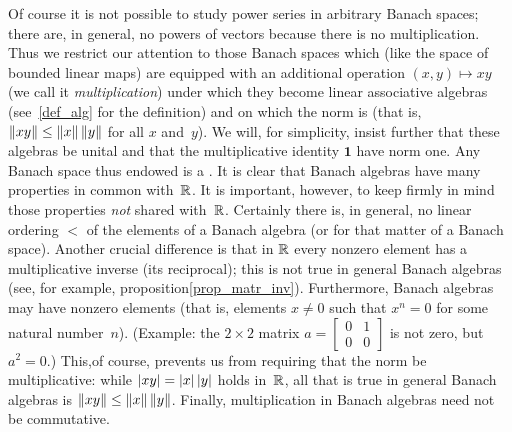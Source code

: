 Of course it is not possible to study power series in arbitrary Banach spaces; there are, in
general, no powers of vectors because there is no multiplication.  Thus we restrict our
attention to those Banach spaces which (like the space of bounded linear maps) are equipped
with an additional operation $(x,y) \mapsto xy$ (we call it \emph{multiplication}) under which
they become linear associative algebras (see~\ref{def_alg} for the definition) and on which
the norm is
 (that is, $\lVert xy\rVert \le \lVert x\rVert\,\lVert y\rVert$ for all $x$ and~$y$).  We
will, for simplicity, insist further that these algebras be unital and that the multiplicative
identity $\boldsymbol 1$ have norm one.  Any Banach space thus endowed is a .  It is clear that Banach algebras have many properties in common with~$\mathbb{R}$.
It is important, however, to keep firmly in mind those properties \emph{not} shared with~$\mathbb{R}$.
Certainly there is, in general, no linear ordering $<$ of the elements of a Banach algebra (or
for that matter of a Banach space).  Another crucial difference is that in $\mathbb{R}$ every nonzero
element has a multiplicative inverse (its reciprocal); this is not true in general Banach
algebras (see, for example, proposition\ref{prop_matr_inv}).  Furthermore, Banach algebras may
have nonzero
 elements (that is, elements $x \ne 0$ such that $x^n = 0$ for some natural
number~$n$).  (Example: the $2 \times 2$ matrix
         $a = \begin{bmatrix} 0  &  1 \\
                               0  &  0
              \end{bmatrix}$ is not zero, but $a^2 = 0$.)  This,of course, prevents us from requiring
that the norm be multiplicative: while $\lvert xy\rvert = \lvert x\rvert\,\lvert y\rvert$ holds in~$\mathbb{R}$, all that is
true in general Banach algebras is $\lVert xy\rVert \le \lVert x\rVert\,\lVert y\rVert$.  Finally, multiplication
in Banach algebras need not be commutative.

